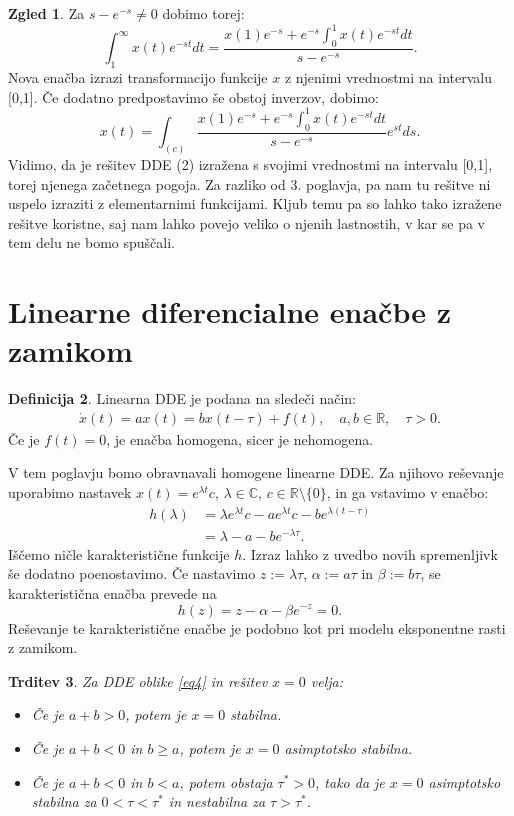 \documentclass[12pt,a4paper]{amsart}
\theoremstyle{definition} %
\newtheorem{definicija}{Definicija}[section]
\newtheorem{zgled}[definicija]{Zgled}
\theoremstyle{plain} %
\newtheorem{trditev}[definicija]{Trditev}
\newcommand{\R}{\mathbb R}
\newcommand{\C}{\mathbb C}
\begin{document}
\begin{zgled}
    Za $s-e^{-s}\neq 0$ dobimo torej:
    \[\int_{1}^{\infty}x(t)e^{-st}dt=\frac{x(1)e^{-s}+e^{-s}\int_0^1x(t)e^{-st}dt}{s-e^{-s}}.\]
    Nova enačba izrazi transformacijo funkcije $x$ z njenimi vrednostmi na intervalu [0,1]. Če 
    dodatno predpostavimo še obstoj inverzov, dobimo:
    \[x(t)=\int_{(c)}\frac{x(1)e^{-s}+e^{-s}\int_0^1x(t)e^{-st}dt}{s-e^{-s}}e^{st}ds.\]
    Vidimo, da je rešitev DDE (2) izražena s svojimi vrednostmi na intervalu [0,1], torej njenega
    začetnega pogoja. Za razliko od 3. poglavja, pa nam tu rešitve ni uspelo
    izraziti z elementarnimi funkcijami. Kljub temu pa so lahko tako izražene rešitve koristne, saj
    nam lahko povejo veliko o njenih lastnostih, v kar se pa v tem delu ne bomo spuščali.
\end{zgled}

\section{Linearne diferencialne enačbe z zamikom}

\begin{definicija}
    Linearna DDE je podana na sledeči način:
    \begin{equation} \label{eq4}
        \begin{split}
            \dot{x}(t)=ax(t)=bx(t-\tau)+f(t),\quad a,b\in\R, \quad \tau>0.
        \end{split}
    \end{equation}
    Če je $f(t)=0$, je enačba homogena, sicer je nehomogena. 
\end{definicija}

V tem poglavju bomo obravnavali homogene linearne DDE. Za njihovo reševanje uporabimo nastavek
$x(t)=e^{\lambda t}c$, $\lambda \in\C$, $c\in\R\setminus\{0\}$, in ga vstavimo v enačbo:
\begin{equation*}
    \begin{split}
        h(\lambda)&=\lambda e^{\lambda t}c - ae^{\lambda t}c -be^{\lambda(t-\tau)} \\
         &= \lambda - a -be^{-\lambda\tau}.
    \end{split}      
\end{equation*}
Iščemo ničle karakteristične funkcije $h$. Izraz lahko z uvedbo novih spremenljivk še dodatno 
poenostavimo. Če nastavimo $z:=\lambda\tau$, $\alpha:=a\tau$ in $\beta:=b\tau$, se karakteristična
enačba prevede na
\[h(z)=z-\alpha-\beta e^{-z}=0.\]
Reševanje te karakteristične enačbe je podobno kot pri modelu eksponentne rasti z zamikom.
\begin{trditev}
    Za DDE oblike \eqref{eq4} in rešitev $x=0$ velja:
    \begin{itemize}
        \item Če je $a+b>0$, potem je $x=0$ stabilna.
        \item Če je $a+b<0$ in $b\geq a$, potem je $x=0$ asimptotsko stabilna.
        \item Če je $a+b<0$ in $b<a$, potem obstaja $\tau^{*}>0$, tako da je $x=0$ 
        asimptotsko stabilna za $0<\tau<\tau^{*}$ in nestabilna za $\tau>\tau^{*}$.
    \end{itemize}
\end{trditev}
\end{document}
